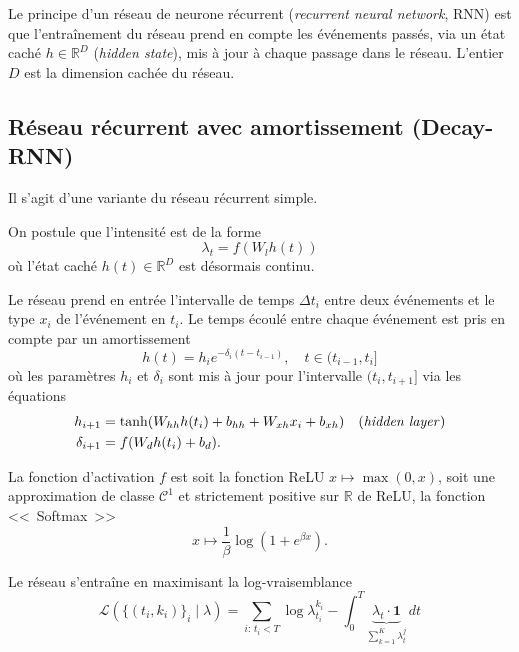 \documentclass[11pt]{article}
\newcommand{\RR}{\mathbb{R}}
\begin{document}
Le principe d'un réseau de neurone récurrent (\textit{recurrent neural network}, RNN) est que l'entraînement du réseau prend en compte les événements passés, via un état caché $h\in\RR^D$ (\textit{hidden state}), mis à jour à chaque passage dans le réseau. L'entier $D$ est la dimension cachée du réseau.

\subsection{Réseau récurrent avec amortissement (Decay-RNN)}

Il s'agit d'une variante du réseau récurrent simple.

On postule que l'intensité est de la forme
\begin{equation}\label{eq:decayrnnhiddenstate}
	\lambda_t = f(W_l h(t))
\end{equation}
où l'état caché $h(t)\in\RR^D$ est désormais continu.

Le réseau prend en entrée l'intervalle de temps $\Delta t_i$ entre deux événements et le type $x_i$ de l'événement en $t_i$.
Le temps écoulé entre chaque événement est pris en compte par un amortissement
\begin{equation}
	h(t) = h_{i}e^{-\delta_i(t-t_{i-1})},\quad t\in(t_{i-1},t_i]
\end{equation}
où les paramètres $h_i$ et $\delta_i$ sont mis à jour pour l'intervalle $(t_i,t_{i+1}]$ via les équations
\begin{subequations}
\begin{align}
h_{i+1} &= \tanh(W_{hh}h(t_i) + b_{hh} + W_{xh}x_i + b_{xh})\quad\text{(\textit{hidden layer})} \\
\delta_{i+1} &= f(W_dh(t_i) + b_d).
\end{align}
\end{subequations}

La fonction d'activation $f$ est soit la fonction ReLU $x\mapsto \max(0,x)$, soit une approximation de classe $\mathcal C^1$ et strictement positive sur $\RR$ de ReLU, la fonction <<~Softmax~>>
\[
	x\mapsto \frac{1}{\beta}\log(1+e^{\beta x}).
\]

Le réseau s'entraîne en maximisant la log-vraisemblance
\begin{equation}
	\mathcal{L}\left(\{(t_i,k_i)\}_i\mid \lambda\right)
	=
	\sum_{i:\,t_i < T} \log\lambda^{k_i}_{t_i} - \int_0^T \underbrace{\lambda_t\cdot\mathbf{1}}_{\sum_{k=1}^K\lambda^j_t}\,dt
\end{equation}
\end{document}
